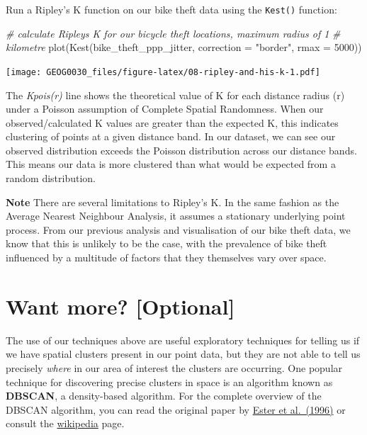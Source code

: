 \documentclass[
]{book}
\newenvironment{Shaded}{\begin{snugshade}}{\end{snugshade}}
\newcommand{\AttributeTok}[1]{\textcolor[rgb]{0.77,0.63,0.00}{#1}}
\newcommand{\CommentTok}[1]{\textcolor[rgb]{0.56,0.35,0.01}{\textit{#1}}}
\newcommand{\DecValTok}[1]{\textcolor[rgb]{0.00,0.00,0.81}{#1}}
\newcommand{\FunctionTok}[1]{\textcolor[rgb]{0.00,0.00,0.00}{#1}}
\newcommand{\NormalTok}[1]{#1}
\newcommand{\StringTok}[1]{\textcolor[rgb]{0.31,0.60,0.02}{#1}}
\begin{document}
Run a Ripley's K function on our bike theft data using the \texttt{Kest()} function:

\begin{Shaded}
\begin{Highlighting}[]
\CommentTok{\# calculate Ripley\textquotesingle{}s K for our bicycle theft locations, maximum radius of 1}
\CommentTok{\# kilometre}
\FunctionTok{plot}\NormalTok{(}\FunctionTok{Kest}\NormalTok{(bike\_theft\_ppp\_jitter, }\AttributeTok{correction =} \StringTok{"border"}\NormalTok{, }\AttributeTok{rmax =} \DecValTok{5000}\NormalTok{))}
\end{Highlighting}
\end{Shaded}

\texttt{[image: GEOG0030\_files/figure-latex/08-ripley-and-his-k-1.pdf]}

The \emph{Kpois(r)} line shows the theoretical value of K for each distance radius (r) under a Poisson assumption of Complete Spatial Randomness. When our observed/calculated K values are greater than the expected K, this indicates clustering of points at a given distance band. In our dataset, we can see our observed distribution exceeds the Poisson distribution across our distance bands. This means our data is more clustered than what would be expected from a random distribution.

\textbf{Note}
There are several limitations to Ripley's K. In the same fashion as the Average Nearest Neighbour Analysis, it assumes a stationary underlying point process. From our previous analysis and visualisation of our bike theft data, we know that this is unlikely to be the case, with the prevalence of bike theft influenced by a multitude of factors that they themselves vary over space.

\hypertarget{wm-w08}{%
\section{Want more? {[}Optional{]}}\label{wm-w08}}

The use of our techniques above are useful exploratory techniques for telling us if we have spatial clusters present in our point data, but they are not able to tell us precisely \emph{where} in our area of interest the clusters are occurring. One popular technique for discovering precise clusters in space is an algorithm known as \textbf{DBSCAN}, a density-based algorithm. For the complete overview of the DBSCAN algorithm, you can read the original paper by \href{https://www.aaai.org/Papers/KDD/1996/KDD96-037.pdf}{Ester et al.~(1996)} or consult the \href{https://en.wikipedia.org/wiki/DBSCAN}{wikipedia} page.
\end{document}
